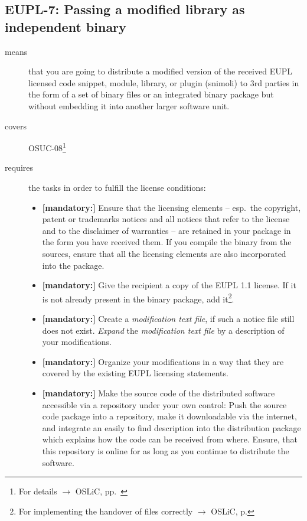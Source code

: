 \subsection{EUPL-7: Passing a modified library as independent binary}

\begin{description}
\item[means] that you are going to distribute a modified version of the received
EUPL licensed code snippet, module, library, or plugin (snimoli) to 3rd
parties in the form of a set of binary files or an integrated binary package but
without embedding it into another larger software unit.
\item[covers] OSUC-08\footnote{For details $\rightarrow$ OSLiC, pp.\ \pageref{OSUC-08-DEF}}
\item[requires] the tasks in order to fulfill the license conditions:
\begin{itemize}

  \item \textbf{[mandatory:]} Ensure that the licensing elements -- esp.\ the
  copyright, patent or trademarks notices and all notices that refer to the
  license and to the disclaimer of warranties -- are retained in your package in
  the form you have received them. If you compile the binary from the sources,
  ensure that all the licensing elements are also incorporated into the package.
  
 \item \textbf{[mandatory:]} Give the recipient a copy of the EUPL 1.1
  license. If it is not already present in the binary package, add
  it\footnote{For implementing the handover of files correctly $\rightarrow$
  OSLiC, p. \pageref{DistributingFilesHint}}.

  \item \textbf{[mandatory:]} Create a \emph{modification text file}, if such a
  notice file still does not exist. \emph{Expand} the \emph{modification text
  file} by a description of your modifications.

  \item \textbf{[mandatory:]} Organize your modifications in a way that they are
  covered by the existing EUPL licensing statements.
  
  \item \textbf{[mandatory:]} Make the source code of the distributed software
  accessible via a repository under your own control: Push the source code
  package into a repository, make it downloadable via the internet, and
  integrate an easily to find description into the distribution package which
  explains how the code can be received from where. Ensure, that this repository
  is online for as long as you continue to distribute the software.
  

\end{itemize}
\end{description}
